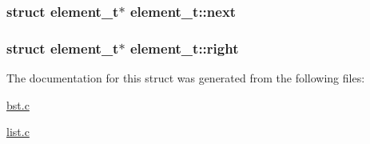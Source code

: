 \hypertarget{structelement__t_aa22632b0ef60425293b31465d7f40b43}{
\subsubsection[{next}]{\setlength{\rightskip}{0pt plus 5cm}struct {\bf element\-\_\-t}$\ast$ element\-\_\-t\-::next}}\label{structelement__t_aa22632b0ef60425293b31465d7f40b43}
\hypertarget{structelement__t_a70eb387a3bcf9feead2cb2b5d4646353}{
\subsubsection[{right}]{\setlength{\rightskip}{0pt plus 5cm}struct {\bf element\-\_\-t}$\ast$ element\-\_\-t\-::right}}\label{structelement__t_a70eb387a3bcf9feead2cb2b5d4646353}


The documentation for this struct was generated from the following files\-:\begin{DoxyCompactItemize}
\item 
\hyperlink{bst_8c}{bst.\-c}\item 
\hyperlink{list_8c}{list.\-c}\end{DoxyCompactItemize}
